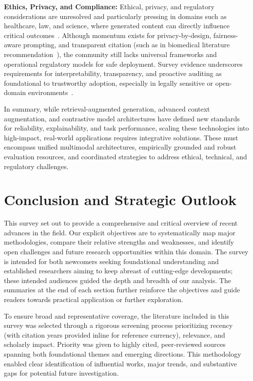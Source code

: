 \documentclass[sigconf]{acmart}
\begin{document}
\textbf{Ethics, Privacy, and Compliance:} Ethical, privacy, and regulatory considerations are unresolved and particularly pressing in domains such as healthcare, law, and science, where generated content can directly influence critical outcomes~\cite{ref6,ref13,ref23,ref30,ref37,ref45,ref55,ref62,ref63}. Although momentum exists for privacy-by-design, fairness-aware prompting, and transparent citation (such as in biomedical literature recommendation~\cite{ref6}), the community still lacks universal frameworks and operational regulatory models for safe deployment. Survey evidence underscores requirements for interpretability, transparency, and proactive auditing as foundational to trustworthy adoption, especially in legally sensitive or open-domain environments~\cite{ref13,ref63}.

In summary, while retrieval-augmented generation, advanced context augmentation, and contrastive model architectures have defined new standards for reliability, explainability, and task performance, scaling these technologies into high-impact, real-world applications requires integrative solutions. These must encompass unified multimodal architectures, empirically grounded and robust evaluation resources, and coordinated strategies to address ethical, technical, and regulatory challenges.

\section{Conclusion and Strategic Outlook}

This survey set out to provide a comprehensive and critical overview of recent advances in the field. Our explicit objectives are to systematically map major methodologies, compare their relative strengths and weaknesses, and identify open challenges and future research opportunities within this domain. The survey is intended for both newcomers seeking foundational understanding and established researchers aiming to keep abreast of cutting-edge developments; these intended audiences guided the depth and breadth of our analysis. The summaries at the end of each section further reinforce the objectives and guide readers towards practical application or further exploration.

To ensure broad and representative coverage, the literature included in this survey was selected through a rigorous screening process prioritizing recency (with citation years provided inline for reference currency), relevance, and scholarly impact. Priority was given to highly cited, peer-reviewed sources spanning both foundational themes and emerging directions. This methodology enabled clear identification of influential works, major trends, and substantive gaps for potential future investigation.
\end{document}
